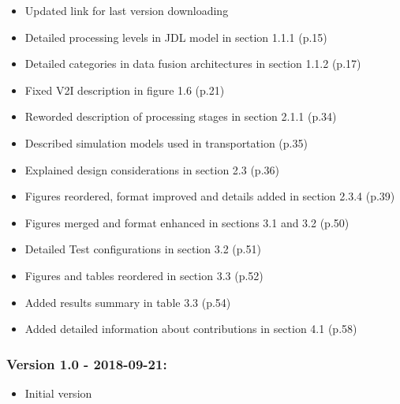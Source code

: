\begin{titlepage}
	\begin{itemize}
	\item Updated link for last version downloading
	\item Detailed processing levels in JDL model  in section 1.1.1 (p.15)
	\item Detailed categories in data fusion architectures in section 1.1.2 (p.17)
	\item Fixed V2I description in figure 1.6 (p.21)
	\item Reworded description of processing stages in section 2.1.1 (p.34)
	\item Described simulation models used in transportation (p.35)
	\item Explained design considerations in section 2.3 (p.36)
	\item Figures reordered, format improved and details added in section 2.3.4 (p.39)
	\item Figures merged and format enhanced in sections 3.1 and 3.2 (p.50)
	\item Detailed Test configurations in section 3.2 (p.51)
	\item Figures and tables reordered in section 3.3 (p.52)
	\item Added results summary in table 3.3 (p.54)
	\item Added detailed information about contributions in section 4.1 (p.58)
	\end{itemize}


\subsubsection*{Version 1.0 - 2018-09-21:}
	\begin{itemize}
	\item Initial version
	\end{itemize}


\end{titlepage}